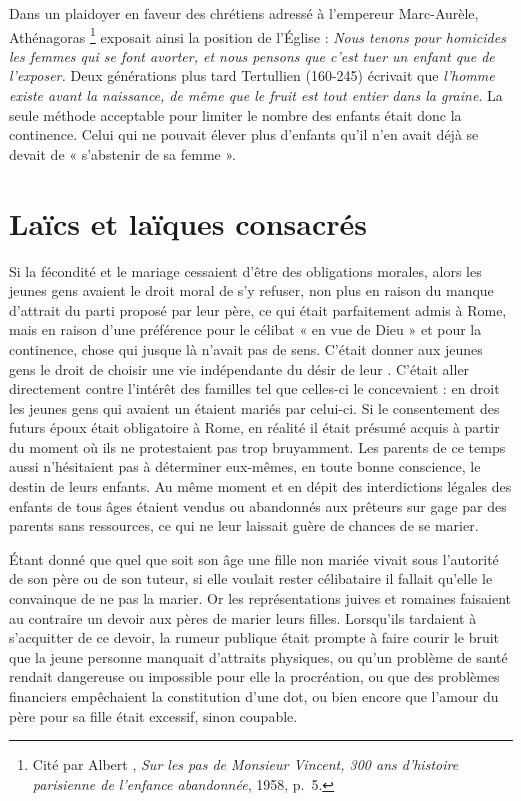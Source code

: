  Dans un plaidoyer en faveur des chrétiens adressé à l'empereur Marc-Aurèle, Athénagoras%
\footnote{Cité par Albert , \emph{Sur les pas de Monsieur Vincent, 300 ans d'histoire parisienne de l'enfance abandonnée}, 1958, p.~5.}
exposait ainsi la position de l'Église : \emph{Nous tenons pour homicides les femmes qui se font avorter, et nous pensons que c'est tuer un enfant que de l'exposer.}  Deux générations plus tard Tertullien (160-245) écrivait que \emph{l'homme existe avant la naissance, de même que le fruit est tout entier dans la graine}. La seule méthode acceptable pour limiter le nombre des enfants était donc la continence. Celui qui ne pouvait élever plus d'enfants qu'il n'en avait déjà se devait de « s'abstenir de sa femme ».
 








\section{Laïcs et laïques consacrés}

 Si la fécondité et le mariage cessaient d'être des obligations morales, alors les jeunes gens avaient le droit moral de s'y refuser, non plus en raison du manque d'attrait du parti proposé par leur père, ce qui était parfaitement admis à Rome, mais en raison d'une préférence pour le célibat « en vue de Dieu » et pour la continence, chose qui jusque là n'avait pas de sens. C'était donner aux jeunes gens le droit de choisir une vie indépendante du désir de leur . C'était aller directement contre l'intérêt des familles tel que celles-ci le concevaient : en droit les jeunes gens qui avaient un  étaient mariés par celui-ci. Si le consentement des futurs époux était obligatoire à Rome, en réalité il était présumé acquis à partir du moment où ils ne protestaient pas trop bruyamment. Les parents de ce temps aussi n'hésitaient pas à déterminer eux-mêmes, en toute bonne conscience, le destin de leurs enfants. Au même moment et en dépit des interdictions légales des enfants de tous âges étaient vendus ou abandonnés aux prêteurs sur gage par des parents sans ressources, ce qui ne leur laissait guère de chances de se marier.

 Étant donné que quel que soit son âge une fille non mariée vivait sous l'autorité de son père ou de son tuteur, si elle voulait rester célibataire il fallait qu'elle le convainque de ne pas la marier. Or les représentations juives et romaines faisaient au contraire un devoir aux pères de marier leurs filles. Lorsqu'ils tardaient à s'acquitter de ce devoir, la rumeur publique était prompte à faire courir le bruit que la jeune personne manquait d'attraits physiques, ou qu'un problème de santé rendait dangereuse ou impossible pour elle la procréation, ou que des problèmes financiers empêchaient la constitution d'une dot, ou bien encore que l'amour du père pour sa fille était excessif, sinon coupable. 

